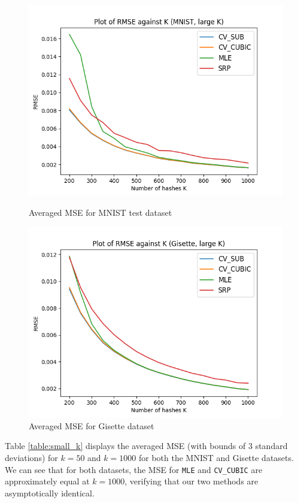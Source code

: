 \documentclass[runningheads]{llncs}
\begin{document}
    \begin{figure}
        \centering
        \begin{minipage}{.45\columnwidth}
            \centering
            \includegraphics[width=\textwidth]{images/mnist_large_mean.png}
            \caption{Averaged MSE for MNIST test dataset}
            \label{mnist:large}
        \end{minipage}
        \hfill
        \begin{minipage}{.45\columnwidth}
            \centering
            \includegraphics[width=\textwidth]{images/gisette_large_mean.png}
            \caption{Averaged MSE for Gisette dataset}
            \label{gisette:large}
        \end{minipage}
    \end{figure}
    Table \ref{table:small_k} displays the averaged MSE (with bounds of 3 standard deviations) for $k=50$ and $k = 1000$ for both the MNIST and Gisette datasets. We can see that for both datasets, the MSE for \verb|MLE| and \verb|CV_CUBIC| are approximately equal at $k = 1000$, verifying that our two methods are asymptotically identical.
    
\end{document}
